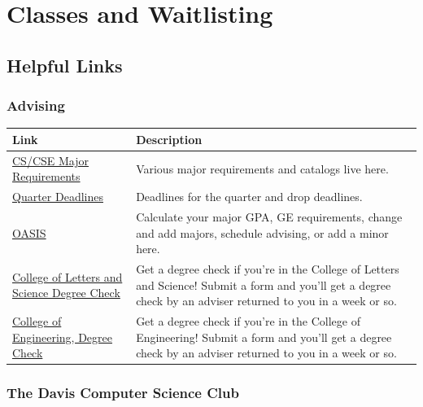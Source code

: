 \documentclass{article}
\begin{document}
\section {Classes and Waitlisting}
\subsection{Helpful Links}
\subsubsection{Advising}
\begin{center}
{\tabulinesep=1.4mm
\begin{tabu} {|p{6cm} |p{8cm}|}
\hline
\textbf{Link} & \textbf{Description} \\ 
\hline
\href{http://www.cs.ucdavis.edu/undergraduate/cs-major/}{CS/CSE Major Requirements} & Various major requirements and catalogs live here. \\ 
\hline
\href{http://registrar.ucdavis.edu/calendar/quarter.cfm}{Quarter Deadlines} & Deadlines for the quarter and drop deadlines. \\
\hline
\href{https://students.ucdavis.edu/}{OASIS} & Calculate your major GPA, GE requirements, change and add majors, schedule advising, or add a minor here.\\
\hline
\href{http://ls.ucdavis.edu/advising/academic-advising/degree-check-request.php}{College of Letters and Science Degree Check} & Get a degree check if you're in the College of Letters and Science! Submit a form and you'll get a degree check by an adviser returned to you in a week or so.\\
\hline
\href{http://engineering.ucdavis.edu/undergraduate/advising-q-a/#a13}{College of Engineering, Degree Check} & Get a degree check if you're in the College of Engineering! Submit a form and you'll get a degree check by an adviser returned to you in a week or so.\\
\hline
\end{tabu}}
\end{center}

\subsubsection{The Davis Computer Science Club}
\end{document}
